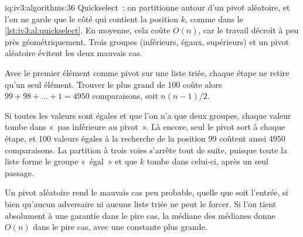 \begin{solution}{iq:iv3:algorithms:36}
Quickselect~: on partitionne autour d'un pivot aléatoire, et l'on ne garde que le côté qui contient la position $k$, comme dans le \cref{lst:iv3:al:quickselect}. En moyenne, cela coûte $O(n)$, car le travail décroît à peu près géométriquement. Trois groupes (inférieurs, égaux, supérieurs) et un pivot aléatoire évitent les deux mauvais cas.
\label{lst:iv3:al:quickselect}

Avec le premier élément comme pivot sur une liste triée, chaque étape ne retire qu'un seul élément. Trouver le plus grand de 100 coûte alors $99 + 98 + \dots + 1 = 4950$ comparaisons, soit $n(n-1)/2$.

Si toutes les valeurs sont égales et que l'on n'a que deux groupes, chaque valeur tombe dans «~pas inférieure au pivot~». Là encore, seul le pivot sort à chaque étape, et 100 valeurs égales à la recherche de la position 99 coûtent aussi 4950 comparaisons. La partition à trois voies s'arrête tout de suite, puisque toute la liste forme le groupe «~égal~» et que $k$ tombe dans celui-ci, après un seul passage.

Un pivot aléatoire rend le mauvais cas peu probable, quelle que soit l'entrée, si bien qu'aucun adversaire ni aucune liste triée ne peut le forcer. Si l'on tient absolument à une garantie dans le pire cas, la médiane des médianes donne $O(n)$ dans le pire cas, avec une constante plus grande.

\end{solution}

